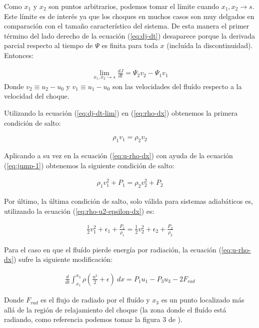 Como $x_1$ y $x_2$ son puntos arbitrarios, podemos tomar el límite cuando $x_1, x_2 \to s$. Este límite es de interés ya que los choques en muchos casos son muy delgados en comparación con el tamaño característico del sistema. De esta manera el primer término del lado derecho de la ecuación (\ref{eq:dj-dt}) desaparece porque la derivada parcial respecto al tiempo de $\Psi$ es finita para toda $x$ (incluída la discontinuidad). Entonces:

\begin{align}
  \lim_{x_1, x_2 \to s}\frac{dJ}{dt} = \Psi_2v_2 - \Psi_1v_1 \label{eq:dj-dt-lim}
\end{align}
Donde $v_2\equiv u_2 - u_0$ y $v_1 \equiv u_1-u_0$ son las velocidades del fluído respecto a la velocidad del choque.

Utilizando la ecuación (\ref{eq:dj-dt-lim}) en (\ref{eq:rho-dx}) obtenemos la primera condición de salto:

\begin{align}
  \rho_1v_1 = \rho_2v_2 \label{eq:jump-1}
\end{align}

Aplicando a su vez en la ecuación (\ref{eq:u-rho-dx}) con ayuda de la ecuación (\ref{eq:jump-1}) obtenemos la siguiente condición de salto:

\begin{align}
  \rho_1v^2_1 + P_1 = \rho_2v^2_2 + P_2\label{eq:jump-2}
\end{align}

Por último, la última condición de salto, solo válida para sistemas adiabáticos es, utilizando la ecuación (\ref{eq:rho-u2-epsilon-dx}) es:

\begin{align}
  \frac{1}{2}v^2_1 + \epsilon_1 + \frac{P_1}{\rho_1} = \frac{1}{2}v^2_2 + \epsilon_2 + \frac{P_2}{\rho_2} \label{eq:jump-3}
\end{align}

Para el caso en que el fluído pierde energía por radiación, la ecuación (\ref{eq:u-rho-dx}) sufre la siguiente modificación:

\begin{align}
     \frac{d}{dt}\int^{x_3}_{x_1} \rho\left(\frac{u^2}{2} + \epsilon\right)~dx = P_1u_1 - P_3u_3 -2F_{rad}\label{eq:rho-u2-epsilon-dx-rad}
\end{align}

Donde $F_{rad}$ es el flujo de radiado por el fluído y $x_3$ es un punto localizado más allá de la región de relajamiento del choque (la zona donde el fluído está radiando, como referencia podemos tomar la figura 3 de \citet{Shull:1979}).

